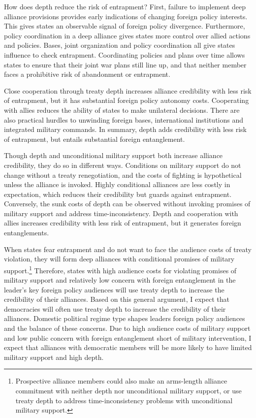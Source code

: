 \documentclass[12pt]{article}
\begin{document}
How does depth reduce the risk of entrapment?   
First, failure to implement deep alliance provisions provides early indications of changing foreign policy interests. 
This gives states an observable signal of foreign policy divergence.
Furthermore, policy coordination in a deep alliance gives states more control over allied actions and policies. 
Bases, joint organization and policy coordination all give states influence to check entrapment.
Coordinating policies and plans over time allows states to ensure that their joint war plans still line up, and that neither member faces a prohibitive risk of abandonment or entrapment.  


Close cooperation through treaty depth increases alliance credibility with less risk of entrapment, but it has substantial foreign policy autonomy costs. 
Cooperating with allies reduces the ability of states to make unilateral decisions. 
There are also practical hurdles to unwinding foreign bases, international institutions and integrated military commands. 
In summary, depth adds credibility with less risk of entrapment, but entails substantial foreign entanglement. 


Though depth and unconditional military support both increase alliance credibility, they do so in different ways. 
Conditions on military support do not change without a treaty renegotiation, and the costs of fighting is hypothetical unless the alliance is invoked.  
Highly conditional alliances are less costly in expectation, which reduces their credibility but guards against entrapment. 
Conversely, the sunk costs of depth can be observed without invoking promises of military support and address time-inconsistency.
Depth and cooperation with allies increases credibility with less risk of entrapment, but it generates foreign entanglements.   


When states fear entrapment and do not want to face the audience costs of treaty violation, they will form deep alliances with conditional promises of military support.\footnote{Prospective alliance members could also make an arms-length alliance commitment with neither depth nor unconditional military support, or use treaty depth to address time-inconsistency problems with unconditional military support.}
Therefore, states with high audience costs for violating promises of military support and relatively low concern with foreign entanglement in the leader's key foreign policy audiences will use treaty depth to increase the credibility of their alliances. 
Based on this general argument, I expect that democracies will often use treaty depth to increase the credibility of their alliances. 
Domestic political regime type shapes leaders foreign policy audiences and the balance of these concerns. 
Due to high audience costs of military support and low public concern with foreign entanglement short of military intervention, I expect that alliances with democratic members will be more likely to have limited military support and high depth. 
\end{document}
